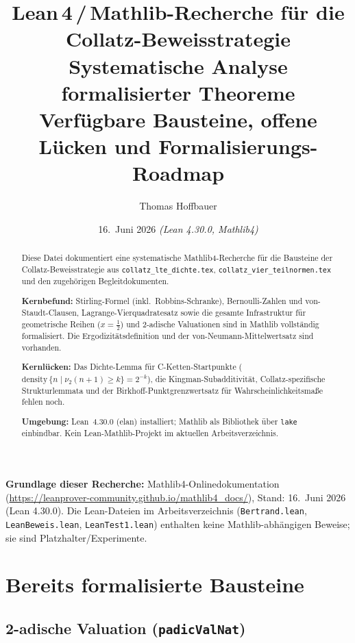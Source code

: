 \documentclass[12pt,a4paper]{article}
\title{%
  Lean\,4\,/\,Mathlib-Recherche für die Collatz-Beweisstrategie\\[0.3em]
  \large Systematische Analyse formalisierter Theoreme\\[0.3em]
  \large Verfügbare Bausteine, offene Lücken und Formalisierungs-Roadmap%
}
\author{Thomas Hoffbauer}
\date{16.\ Juni 2026 \quad\textit{(Lean 4.30.0, Mathlib4)}}
\newcommand{\vii}{\nu_2}
\begin{document}
\maketitle

\begin{abstract}
Diese Datei dokumentiert eine systematische Mathlib4-Recherche für die Bausteine der
Collatz-Beweisstrategie aus \texttt{collatz\_lte\_dichte.tex},
\texttt{collatz\_vier\_teilnormen.tex} und den zugehörigen Begleitdokumenten.

\textbf{Kernbefund:} Stirling-Formel (inkl.\ Robbins-Schranke), Bernoulli-Zahlen und
von-Staudt-Clausen, Lagrange-Vierquadratesatz sowie die gesamte Infrastruktur für
geometrische Reihen ($x=\tfrac12$) und 2-adische Valuationen sind in Mathlib vollständig
formalisiert. Die Ergodizitätsdefinition und der von-Neumann-Mittelwertsatz sind vorhanden.

\textbf{Kernlücken:} Das Dichte-Lemma für C-Ketten-Startpunkte
($\mathrm{density}\,\{n \mid \vii(n+1)\geq k\} = 2^{-k}$), die Kingman-Subadditivität,
Collatz-spezifische Strukturlemmata und der Birkhoff-Punktgrenzwertsatz für
Wahrscheinlichkeitsmaße fehlen noch.

\textbf{Umgebung:} Lean~4.30.0 (elan) installiert; Mathlib als Bibliothek über
\texttt{lake} einbindbar. Kein Lean-Mathlib-Projekt im aktuellen Arbeitsverzeichnis.
\end{abstract}

\tableofcontents
\bigskip

\begin{tcolorbox}[warnung]
\textbf{Grundlage dieser Recherche:} Mathlib4-Onlinedokumentation
(\url{https://leanprover-community.github.io/mathlib4_docs/}),
Stand: 16.\ Juni 2026 (Lean 4.30.0).
Die Lean-Dateien im Arbeitsverzeichnis (\texttt{Bertrand.lean},
\texttt{LeanBeweis.lean}, \texttt{LeanTest1.lean}) enthalten keine
Mathlib-abhängigen Beweise; sie sind Platzhalter/Experimente.
\end{tcolorbox}

\section{Bereits formalisierte Bausteine}
\label{sec:vorhanden}

\subsection{2-adische Valuation (\texttt{padicValNat})}
\end{document}
